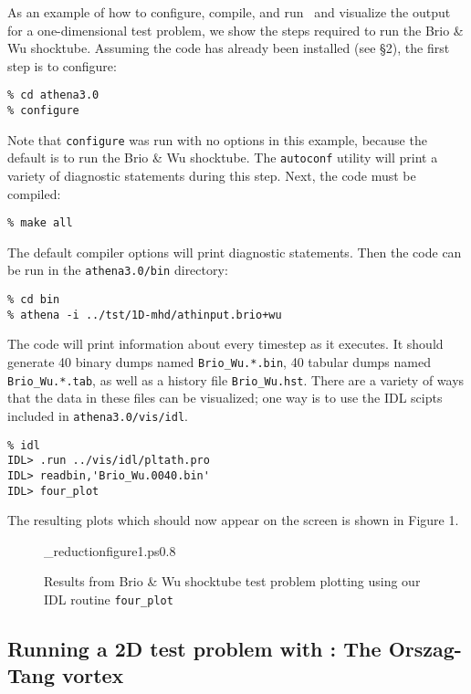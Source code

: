 As an example of how to configure, compile, and run \ath\ and visualize
the output for a one-dimensional test problem, we show the steps required 
to run the Brio \& Wu shocktube.
Assuming the code has already been installed (see \S2), the first step is
to configure:
\footnotesize
\begin{verbatim}
% cd athena3.0
% configure
\end{verbatim}
\normalsize
Note that {\tt configure} was run with no options in this example, because
the default is to run the Brio \& Wu shocktube.
The {\tt autoconf} utility will print a variety of diagnostic statements during
this step.  Next, the code must be compiled:
\footnotesize
\begin{verbatim}
% make all
\end{verbatim}
\normalsize
The default compiler options will print diagnostic statements.  Then
the code can be run in the {\tt athena3.0/bin} directory:
\footnotesize
\begin{verbatim}
% cd bin
% athena -i ../tst/1D-mhd/athinput.brio+wu
\end{verbatim}
\normalsize
The code will print information about every timestep as it executes.  It
should generate 40 binary dumps named {\tt Brio\_Wu.*.bin}, 40 tabular
dumps named {\tt Brio\_Wu.*.tab},
as well as a history file {\tt Brio\_Wu.hst}.  There
are a variety of ways that the data in these files can be visualized; one
way is to use the IDL scipts included in {\tt athena3.0/vis/idl}.
\footnotesize
\begin{verbatim}
% idl
IDL> .run ../vis/idl/pltath.pro
IDL> readbin,'Brio_Wu.0040.bin'
IDL> four_plot
\end{verbatim}
\normalsize

The resulting plots which should now appear on the screen is shown in Figure 1. 

\begin{figure}[htb!]
\plotone_reduction{figure1.ps}{0.8}
\caption{Results from Brio \& Wu shocktube test problem plotting using our
IDL routine {\tt four\_plot}}
\end{figure}

\subsection{Running a 2D test problem with \ath: The Orszag-Tang vortex}

